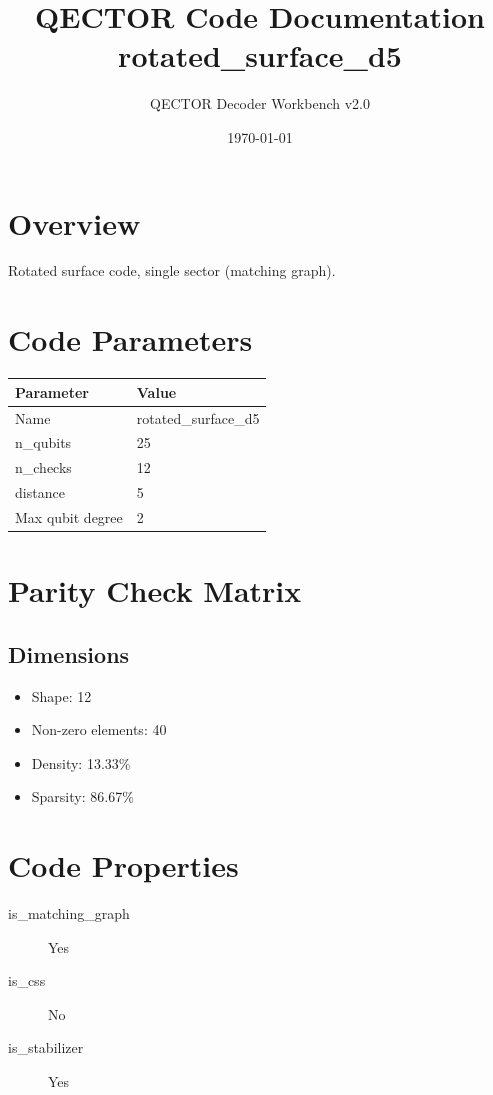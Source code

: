 \documentclass[11pt]{article}
\title{QECTOR Code Documentation \\
\large rotated_surface_d5}
\author{QECTOR Decoder Workbench v2.0}
\date{\today}
\begin{document}
\maketitle

\section{Overview}

Rotated surface code, single sector (matching graph).

\section{Code Parameters}

\begin{tabular}{ll}
\hline
\textbf{Parameter} & \textbf{Value} \\
\hline
Name & rotated_surface_d5 \\
n\_qubits & 25 \\
n\_checks & 12 \\
distance & 5 \\
Max qubit degree & 2 \\
\hline
\end{tabular}

\section{Parity Check Matrix}

\subsection{Dimensions}
\begin{itemize}
    \item Shape: 12 
    \item Non-zero elements: 40
    \item Density: 13.33\%
    \item Sparsity: 86.67\%
\end{itemize}

\section{Code Properties}

\begin{description}
\item[is_matching_graph] Yes
\item[is_css] No
\item[is_stabilizer] Yes
\end{description}
\end{document}
